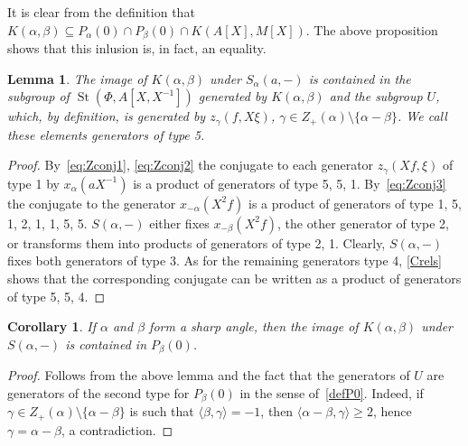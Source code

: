 \documentclass[oneside, 8pt]{amsart}
\newtheorem{corollary}{Corollary}
\newtheorem{lemma}{Lemma}
\theoremstyle{remark}
\theoremstyle{definition}
\DeclareMathOperator{\St}{St}
\numberwithin{equation}{section}
\begin{document}
It is clear from the definition that $K(\alpha, \beta) \subseteq P_\alpha(0) \cap P_\beta(0) \cap K(A[X], M[X])$.
The above proposition shows that this inlusion is, in fact, an equality.
  
\begin{lemma}
 The image of $K(\alpha, \beta)$ under $S_{\alpha}(a, -)$ is contained in the subgroup of $\St(\Phi, A[X, X^{-1}])$ 
 generated by $K(\alpha, \beta)$ and the subgroup $U$, which, by definition, is generated by $z_\gamma(f, X\xi)$, $\gamma \in Z_+(\alpha) \setminus \{ \alpha - \beta \}$.
 We call these elements generators of type 5.
\end{lemma}
\begin{proof}
By~\eqref{eq:Zconj1}, \eqref{eq:Zconj2} the conjugate to each generator $z_\gamma(Xf, \xi)$ of type 1 by $x_\alpha(aX^{-1})$ is a product of generators of type 5, 5, 1.
By~\eqref{eq:Zconj3} the conjugate to the generator $x_{-\alpha}(X^2f)$ is a product of generators of type 1, 5, 1, 2, 1, 1, 5, 5.
$S(\alpha, -)$ either fixes $x_{-\beta}(X^2f)$, the other generator of type 2, or transforms them into products of generators of type 2, 1.
Clearly, $S(\alpha, -)$ fixes both generators of type 3. 
As for the remaining generators type 4, \cref{Crels} shows that the corresponding conjugate can be written as a product of generators of type 5, 5, 4.
\end{proof}  

\begin{corollary} If $\alpha$ and $\beta$ form a sharp angle, then the image of $K(\alpha, \beta)$ under $S(\alpha, -)$ is contained in $P_\beta(0)$. \end{corollary}
\begin{proof} Follows from the above lemma and the fact that the generators of $U$ are generators of the second type for $P_\beta(0)$ in the sense of~\cref{defP0}.
 Indeed, if $\gamma \in Z_+(\alpha) \setminus \{ \alpha - \beta \}$ is such that $\langle \beta, \gamma \rangle = -1$, then $ \langle \alpha - \beta, \gamma \rangle \geq 2$, hence
  $\gamma = \alpha - \beta$, a contradiction. \end{proof}
\end{document}
